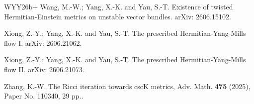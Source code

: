 \documentclass[12pt, reqno]{amsart}
\theoremstyle{plain}
\theoremstyle{definition}
\renewcommand{\>}{\rightarrow}
\numberwithin{equation}{section}
\begin{document}
\begin{thebibliography}{WYY26b+}
	Wang, M.-W.; Yang, X.-K. and Yau, S.-T.
	Existence of twisted Hermitian-Einstein metrics on unstable vector bundles.
	arXiv: 2606.15102.
	
	
	
	Xiong, Z.-Y.; Yang, X.-K. and Yau, S.-T.
	The prescribed Hermitian-Yang-Mills flow I.
	arXiv: 2606.21062.
	
	Xiong, Z.-Y.; Yang, X.-K. and Yau, S.-T.
	The prescribed Hermitian-Yang-Mills flow II.
	arXiv: 2606.21073.
	
	
	
	
		Zhang, K.-W. The Ricci iteration towards cscK metrics, Adv. Math. {\bf 475} (2025), Paper No. 110340, 29 pp..
	
\end{thebibliography}
\end{document}
